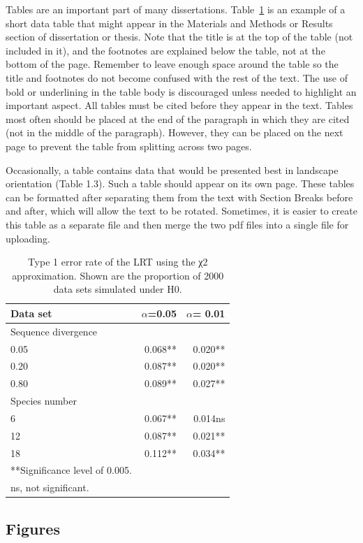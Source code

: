 Tables are an important part of many dissertations. Table~\ref{LRTtable} is an example of a short data table that might appear in the Materials and Methods or Results section of dissertation or thesis. Note that the title is at the top of the table (not included in it), and the footnotes are explained below the table, not at the bottom of the page. Remember to leave enough space around the table so the title and footnotes do not become confused with the rest of the text. The use of bold or underlining in the table body is discouraged unless needed to highlight an important aspect. All tables must be cited before they appear in the text. Tables most often should be placed at the end of the paragraph in which they are cited (not in the middle of the paragraph). However, they can be placed on the next page to prevent the table from splitting across two pages.

Occasionally, a table contains data that would be presented best in landscape orientation (Table 1.3). Such a table should appear on its own page. These tables can be formatted after separating them from the text with Section Breaks before and after, which will allow the text to be rotated. Sometimes, it is easier to create this table as a separate file and then merge the two pdf files into a single file for uploading.

\begin{table}
\caption{Type 1 error rate of the LRT using the χ2 approximation. Shown are the proportion of 2000 data sets simulated under H0.\label{LRTtable}}
\begin{tabular}{l r r}
\hline
Data set & $\alpha$=0.05 & $\alpha$= 0.01 \\
\hline
Sequence divergence \\
0.05 & 0.068** & 0.020** \\
0.20 & 0.087** & 0.020** \\
0.80 & 0.089** & 0.027** \\
Species number \\
6 & 0.067** & 0.014ns \\
12 & 0.087** & 0.021** \\
18 & 0.112** & 0.034** \\
\hline
**Significance level of 0.005. \\
ns, not significant. 
\end{tabular}
\end{table}

\subsection{Figures}

